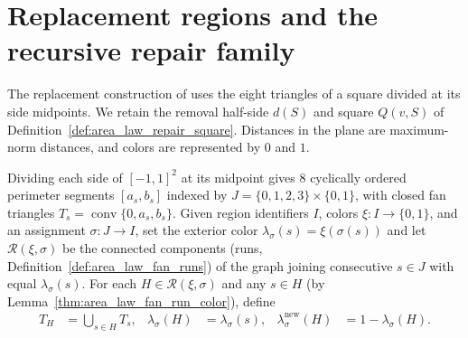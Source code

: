 \section{Replacement regions and the recursive repair family}
\label{sec:area_law_repair_regions}

The replacement construction of \cite[Section~11]{OpenAI2026AreaLaw}
uses the eight triangles of a square divided at its side midpoints.
We retain the removal half-side $d(S)$ and square $Q(v,S)$ of
Definition~\ref{def:area_law_repair_square}. Distances in the plane are
maximum-norm distances, and colors are represented by $0$ and $1$.


\begin{definition}
    \label{def:area_law_repair_fan}
    \leanok
    Dividing each side of $[-1,1]^2$ at its midpoint gives $8$ cyclically ordered perimeter
    segments $[a_s,b_s]$ indexed by $J=\{0,1,2,3\}\times\{0,1\}$, with closed fan triangles
    $T_s=\operatorname{conv}\{0,a_s,b_s\}$. Given region identifiers $I$, colors $\xi:I\to\{0,1\}$,
    and an assignment $\sigma:J\to I$, set the exterior color $\lambda_\sigma(s)=\xi(\sigma(s))$
    and let $\mathcal R(\xi,\sigma)$ be the connected components (runs, Definition~\ref{def:area_law_fan_runs})
    of the graph joining consecutive $s\in J$ with equal $\lambda_\sigma(s)$. For each
    $H\in\mathcal R(\xi,\sigma)$ and any $s\in H$ (by Lemma~\ref{thm:area_law_fan_run_color}), define
    \begin{align}
        T_H & =\bigcup_{s\in H}T_s,
            & \lambda_\sigma(H)                & =\lambda_\sigma(s),
            & \lambda_\sigma^{\mathrm{new}}(H) & =1-\lambda_\sigma(H).
        \label{eq:area_law_repair_run}
    \end{align}
\end{definition}

